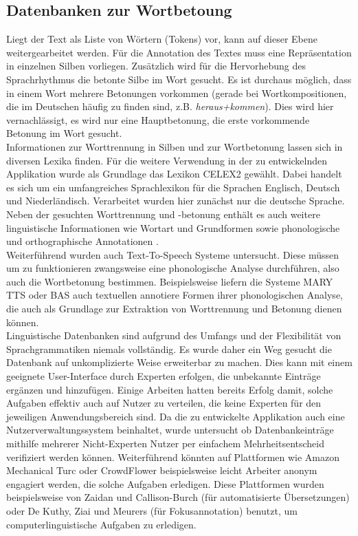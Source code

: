 \subsection{Datenbanken zur Wortbetoung}
\label{sec:forschung-database}

Liegt der Text als Liste von Wörtern (Tokens) vor, kann auf dieser Ebene weitergearbeitet werden. Für die Annotation des Textes muss eine Repräsentation in einzelnen Silben vorliegen. Zusätzlich wird für die Hervorhebung des Sprachrhythmus die betonte Silbe im Wort gesucht. Es ist durchaus möglich, dass in einem Wort mehrere Betonungen vorkommen (gerade bei Wortkompositionen, die im Deutschen häufig zu finden sind, z.B. \textit{heraus+kommen}). Dies wird hier vernachlässigt, es wird nur eine Hauptbetonung, die erste vorkommende Betonung im Wort gesucht.\\
Informationen zur Worttrennung in Silben und zur Wortbetonung lassen sich in diversen Lexika finden.  Für die weitere Verwendung in der zu entwickelnden Applikation wurde als Grundlage das Lexikon CELEX2 gewählt. Dabei handelt es sich um ein umfangreiches Sprachlexikon für die Sprachen Englisch, Deutsch und Niederländisch. Verarbeitet wurden hier zunächst nur die deutsche Sprache. Neben der gesuchten Worttrennung und -betonung enthält es auch weitere linguistische Informationen wie Wortart und Grundformen sowie phonologische und orthographische Annotationen  .
\\
Weiterführend wurden auch Text-To-Speech Systeme  untersucht. Diese müssen um zu funktionieren zwangsweise eine phonologische Analyse durchführen, also auch die Wortbetonung bestimmen. Beispielsweise liefern die Systeme MARY TTS oder BAS auch textuellen annotiere Formen ihrer phonologischen Analyse, die auch als Grundlage zur Extraktion von Worttrennung und Betonung dienen können.\\

Linguistische Datenbanken sind aufgrund des Umfangs und der Flexibilität von Sprachgrammatiken niemals vollständig. Es wurde daher ein Weg gesucht die Datenbank auf unkomplizierte Weise erweiterbar zu machen. Dies kann mit einem geeignete User-Interface durch Experten erfolgen, die unbekannte Einträge ergänzen und hinzufügen. Einige Arbeiten hatten bereits Erfolg damit, solche Aufgaben effektiv auch auf Nutzer zu verteilen, die keine Experten für den jeweiligen Anwendungsbereich sind. Da die zu entwickelte Applikation auch eine Nutzerverwaltungssystem beinhaltet, wurde untersucht ob Datenbankeinträge mithilfe mehrerer Nicht-Experten Nutzer per einfachem Mehrheitsentscheid verifiziert werden können. Weiterführend könnten auf Plattformen wie Amazon Mechanical Turc oder CrowdFlower beispielsweise leicht Arbeiter anonym engagiert werden, die solche Aufgaben erledigen\cite{Snow2008}. Diese Plattformen wurden beispielsweise von Zaidan und Callison-Burch (für automatisierte Übersetzungen)\cite{Zaidan2011} oder De Kuthy, Ziai und Meurers\cite{Meurers2015} (für Fokusannotation) benutzt, um computerlinguistische Aufgaben zu erledigen.